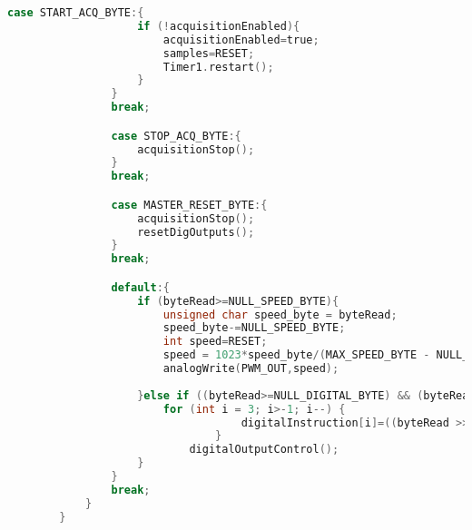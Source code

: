 \begin{lstlisting}[language=C]
				case START_ACQ_BYTE:{
					if (!acquisitionEnabled){
						acquisitionEnabled=true;
						samples=RESET;
						Timer1.restart();
					}
				}
				break;

				case STOP_ACQ_BYTE:{
					acquisitionStop();
				}
				break;

				case MASTER_RESET_BYTE:{
					acquisitionStop();
					resetDigOutputs();
				}
				break;

				default:{
					if (byteRead>=NULL_SPEED_BYTE){
						unsigned char speed_byte = byteRead;
						speed_byte-=NULL_SPEED_BYTE;
						int speed=RESET;
						speed = 1023*speed_byte/(MAX_SPEED_BYTE - NULL_SPEED_BYTE);
						analogWrite(PWM_OUT,speed);
						
					}else if ((byteRead>=NULL_DIGITAL_BYTE) && (byteRead<=MAX_DIGITAL_BYTE)){
						for (int i = 3; i>-1; i--) {
									digitalInstruction[i]=((byteRead >> i) & 1);
								}
							digitalOutputControl();
					}
				}
				break;
			}
		}
	\end{lstlisting}